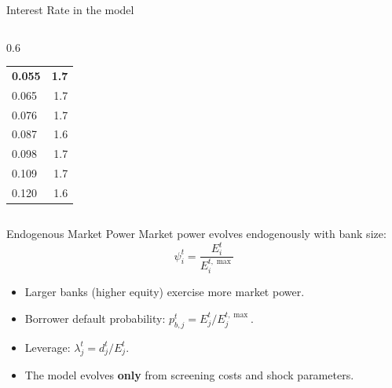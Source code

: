 \begin{frame}{Interest Rate in the model}
\begin{columns}[T]
\begin{column}{0.6\textwidth}
\begin{tabular}{lr}
          \textbf{0.055} & \textbf{1.7} \\
          0.065 & 1.7 \\
          0.076 & 1.7 \\
          0.087 & 1.6 \\
          0.098 & 1.7 \\
          0.109 & 1.7 \\
          0.120 & 1.6 \\
        \bottomrule
      \end{tabular}
    \end{column}
  \end{columns}
\end{frame}

\begin{frame}{Endogenous Market Power}
  Market power evolves endogenously with bank size:
  \[
    \psi_i^t = \frac{E_i^t}{E_i^{t,\max}}
  \]
  \begin{itemize}
    \item Larger banks (higher equity) exercise more market power.
    \item Borrower default probability:
    $p_{b,j}^t = E_j^t / E_j^{t,\max}$.
    \item Leverage: $\lambda_j^t = d_j^t / E_j^t$.
    \item The model evolves \textbf{only} from screening costs and shock parameters.
  \end{itemize}
\end{frame}


